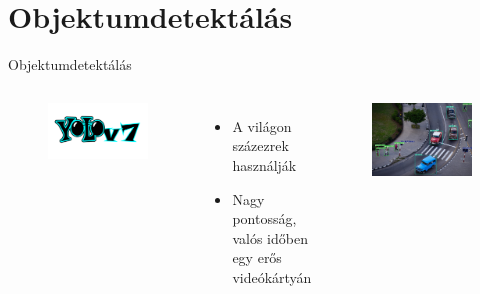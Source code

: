 \documentclass{beamer}
\begin{document}
\section{Objektumdetektálás}
\begin{frame}{Objektumdetektálás}
    \begin{columns}
        \begin{figure}
            \includegraphics[scale=0.05]{yolo_logo.png}
        \end{figure}
        \begin{itemize}
            \item A világon százezrek használják
            \item Nagy pontosság, valós időben egy erős videókártyán
        \end{itemize}

        \centering
        \begin{figure}
            \includegraphics[scale=0.15]{yolo_img.jpg} 
        \end{figure}

    \end{columns}
\end{frame}
\end{document}
